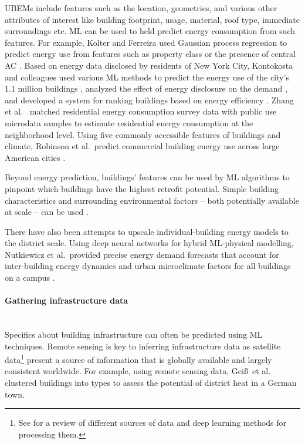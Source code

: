 \documentclass[11pt]{report}
\newcommand{\et}{et al.~}
\newcommand{\Gap}{\texorpdfstring{\hfill}{}}
\newcommand{\Rec}{\texorpdfstring{{\small\emph{\color{blue}{\fbox{High Leverage}}}}}{}}
\begin{document}
UBEMs include features such as the location, geometries, and various other attributes of interest like building footprint, usage, material, roof type, immediate surroundings etc. ML can be used to held predict energy consumption from such features. For example, Kolter and Ferreira used Gaussian process regression to predict energy use from features such as property class or the presence of central AC \cite{kolter_large-scale_2011}. Based on energy data disclosed by residents of New York City, Kontokosta and colleagues used various ML methods to predict the energy use of the city's 1.1 million buildings \cite{kontokosta2017data}, analyzed the effect of energy disclosure on the demand \cite{papadopoulos2018pattern}, and developed a system for ranking buildings based on energy efficiency \cite{PAPADOPOULOS2019244}. Zhang \et \cite{ZHANG2018162} matched residential energy consumption survey data with public use microdata samples to estimate residential energy consumption at the neighborhood level. Using five commonly accessible features of buildings and climate, Robinson et al.~predict commercial building energy use across large American cities \cite{robinson2017machine}.

Beyond energy prediction, buildings' features can be used by ML algorithms to pinpoint which buildings have the highest retrofit potential. Simple building characteristics and surrounding environmental factors -- both potentially available at scale -- can be used \cite{khayatian2017building, bocher2018geoprocessing}.

There have also been attempts to upscale individual-building energy models to the district scale. Using deep neural networks for hybrid ML-physical modelling, Nutkiewicz \et provided precise energy demand forecasts that account for inter-building energy dynamics and urban microclimate factors for all buildings on a campus \cite{nutkiewicz2018data}.


\paragraph{Gathering infrastructure data}\Gap\textbf{\Rec}\mbox{}\\%
\label{sec:bldginfrastructure}Specifics about building infrastructure can often be predicted using ML techniques.  
Remote sensing is key to inferring infrastructure data \cite{esch2017breaking,microsoftbuildings,yu2018deepsolar,LU2014134,Henn2012,blaha2016large} as satellite data\footnote{See \cite{zhu2017deep} for a review of different sources of data and deep learning methods for processing them.} present a source of information that is globally available and largely consistent worldwide. For example, using remote sensing data, Gei\ss \ \et \cite{Gei__2011} clustered buildings into types to assess the potential of district heat in a German town. 
\end{document}
